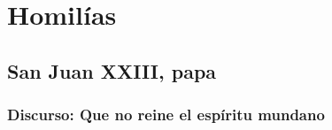 \newsection		

	\section{Homilías}
	
	\homiliasSFamilia
	
		\subsection{San Juan XXIII, papa}
		
			\subsubsection{Discurso: Que no reine el espíritu mundano}
			
				
